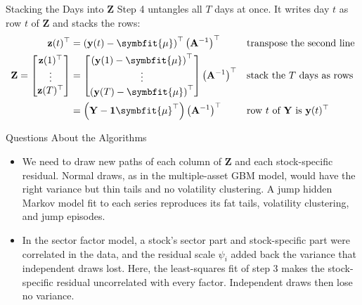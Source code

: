 \documentclass[aspectratio=169,11pt]{beamer}
\begin{document}
\begin{frame}{Stacking the Days into $\mathbf{Z}$}
  Step 4 untangles all $T$ days at once. It writes day $t$ as row $t$ of $\mathbf{Z}$ and stacks the
  rows:
  \begin{align*}
    \mathbf{z}(t)^{\top} &= \left(\mathbf{y}(t)-\symbfit{\mu}\right)^{\top}\left(\mathbf{A}^{-1}\right)^{\top} && \text{transpose the second line}\\
    \mathbf{Z} = \begin{bmatrix}\mathbf{z}(1)^{\top}\\ \vdots\\ \mathbf{z}(T)^{\top}\end{bmatrix} &= \begin{bmatrix}\left(\mathbf{y}(1)-\symbfit{\mu}\right)^{\top}\\ \vdots\\ \left(\mathbf{y}(T)-\symbfit{\mu}\right)^{\top}\end{bmatrix}\left(\mathbf{A}^{-1}\right)^{\top} && \text{stack the } T \text{ days as rows}\\
    &= \left(\mathbf{Y}-\mathbf{1}\symbfit{\mu}^{\top}\right)\left(\mathbf{A}^{-1}\right)^{\top} && \text{row } t \text{ of } \mathbf{Y} \text{ is } \mathbf{y}(t)^{\top}
  \end{align*}
\end{frame}

\begin{frame}{Questions About the Algorithms}
  \begin{itemize}\setlength{\itemsep}{0.5em}
    \item {} We need to draw new paths of each column of
      $\mathbf{Z}$ and each stock-specific residual. Normal draws, as in the multiple-asset GBM model,
      would have the right variance but thin tails and no volatility clustering. A jump hidden Markov
      model fit to each series reproduces its fat tails, volatility clustering, and jump episodes.
    \item {} In the sector factor model, a stock's sector part and
      stock-specific part were correlated in the data, and the residual scale $\psi_{i}$ added back the
      variance that independent draws lost. Here, the least-squares fit of step 3 makes the
      stock-specific residual uncorrelated with every factor. Independent draws then lose no variance.
  \end{itemize}

\end{frame}
\end{document}
